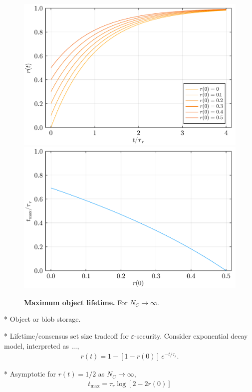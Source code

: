 \begin{figure}[!htp]
	\includegraphics[width=\columnwidth]{figs/DObS_r_time.pdf}\\
	\includegraphics[width=\columnwidth]{figs/DObS_max_time.pdf}
	\caption{\textbf{Maximum object lifetime.} For $N_C\to\infty$.} \label{fig:DObS_max_time}
\end{figure}

* Object or blob storage.

* Lifetime/consensus set size tradeoff for $\varepsilon$-security. Consider exponential decay model, interpreted as ...,
\begin{align}
	r(t) = 1-[1 - r(0)]\, e^{-t/\tau_r}.
\end{align}

* Asymptotic for $r(t)=1/2$ as $N_C\to\infty$,
\begin{align}
	t_\mathrm{max}=\tau_r \log[2-2r(0)]
\end{align}

